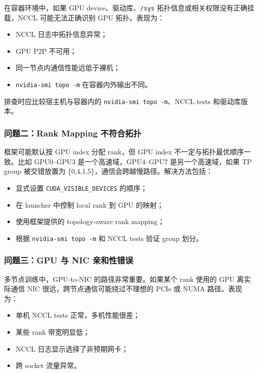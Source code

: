 在容器环境中，如果 GPU device、驱动库、\texttt{/sys} 拓扑信息或相关权限没有正确挂载，NCCL 可能无法正确识别 GPU 拓扑。表现为：

\begin{itemize}
  \item NCCL 日志中拓扑信息异常；
  \item GPU P2P 不可用；
  \item 同一节点内通信性能远低于裸机；
  \item \texttt{nvidia-smi topo -m} 在容器内外输出不同。
\end{itemize}

排查时应比较宿主机与容器内的 \texttt{nvidia-smi topo -m}、NCCL tests 和驱动库版本。

\subsubsection{问题二：Rank Mapping 不符合拓扑}

框架可能默认按 GPU index 分配 rank，但 GPU index 不一定与拓扑最优顺序一致。比如 GPU0--GPU3 是一个高速域，GPU4--GPU7 是另一个高速域，如果 TP group 被交错放置为 \{0,4,1,5\}，通信会跨越慢路径。解决方法包括：

\begin{itemize}
  \item 显式设置 \texttt{CUDA\_VISIBLE\_DEVICES} 的顺序；
  \item 在 launcher 中控制 local rank 到 GPU 的映射；
  \item 使用框架提供的 topology-aware rank mapping；
  \item 根据 \texttt{nvidia-smi topo -m} 和 NCCL tests 验证 group 划分。
\end{itemize}

\subsubsection{问题三：GPU 与 NIC 亲和性错误}

多节点训练中，GPU-to-NIC 的路径非常重要。如果某个 rank 使用的 GPU 离实际通信 NIC 很远，跨节点通信可能绕过不理想的 PCIe 或 NUMA 路径。表现为：

\begin{itemize}
  \item 单机 NCCL tests 正常，多机性能很差；
  \item 某些 rank 带宽明显低；
  \item NCCL 日志显示选择了非预期网卡；
  \item 跨 socket 流量异常。
\end{itemize}

